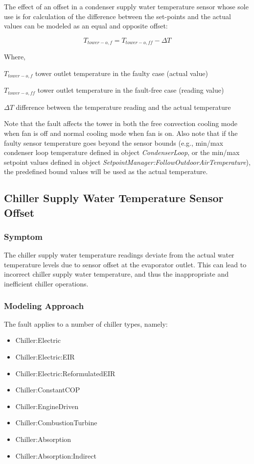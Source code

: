 The effect of an offset in a condenser supply water temperature sensor whose sole use is for calculation of the difference between the set-points and the actual values can be modeled as an equal and opposite offset: 

\begin{equation}
T_{tower-o,f} = T_{tower-o,ff} - \Delta T
\end{equation}

Where,

\(T_{tower-o,f}\) tower outlet temperature in the faulty case (actual value)

\(T_{tower-o,ff}\) tower outlet temperature in the fault-free case (reading value)

\(\Delta T\) difference between the temperature reading and the actual temperature

Note that the fault affects the tower in both the free convection cooling mode when fan is off and normal cooling mode when fan is on. Also note that if the faulty sensor temperature goes beyond the sensor bounds (e.g., min/max condenser loop temperature defined in object \emph{CondenserLoop}, or the min/max setpoint values defined in object \emph{SetpointManager:FollowOutdoorAirTemperature}), the predefined bound values will be used as the actual temperature.


\subsection{Chiller Supply Water Temperature Sensor Offset}\label{chiller-supply-water-temperature-sensor-offset}

\subsubsection{Symptom}

The chiller supply water temperature readings deviate from the actual water temperature levels due to sensor offset at the evaporator outlet. This can lead to incorrect chiller supply water temperature, and thus the inappropriate and inefficient chiller operations.

\subsubsection{Modeling Approach}

The fault applies to a number of chiller types, namely:

\begin{itemize}
\tightlist
\item
  Chiller:Electric
\item
  Chiller:Electric:EIR
\item
  Chiller:Electric:ReformulatedEIR
\item
  Chiller:ConstantCOP
\item
  Chiller:EngineDriven
\item
  Chiller:CombustionTurbine
\item
  Chiller:Absorption
\item
  Chiller:Absorption:Indirect
\end{itemize}

